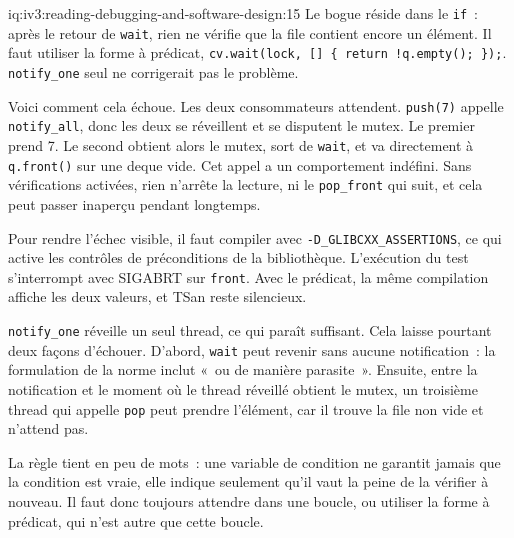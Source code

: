 \begin{solution}{iq:iv3:reading-debugging-and-software-design:15}
Le bogue réside dans le \texttt{if}~: après le retour de \texttt{wait}, rien ne vérifie que la file contient encore un élément. Il faut utiliser la forme à prédicat, \texttt{cv.wait(lock, [] \{ return !q.empty(); \});}. \texttt{notify\_one} seul ne corrigerait pas le problème.

Voici comment cela échoue. Les deux consommateurs attendent. \texttt{push(7)} appelle \texttt{notify\_all}, donc les deux se réveillent et se disputent le mutex. Le premier prend 7. Le second obtient alors le mutex, sort de \texttt{wait}, et va directement à \texttt{q.front()} sur une deque vide. Cet appel a un comportement indéfini. Sans vérifications activées, rien n'arrête la lecture, ni le \texttt{pop\_front} qui suit, et cela peut passer inaperçu pendant longtemps.

Pour rendre l'échec visible, il faut compiler avec \texttt{-D\_GLIBCXX\_ASSERTIONS}, ce qui active les contrôles de préconditions de la bibliothèque. L'exécution du test s'interrompt avec SIGABRT sur \texttt{front}. Avec le prédicat, la même compilation affiche les deux valeurs, et TSan reste silencieux.

\texttt{notify\_one} réveille un seul thread, ce qui paraît suffisant. Cela laisse pourtant deux façons d'échouer. D'abord, \texttt{wait} peut revenir sans aucune notification~: la formulation de la norme inclut «~ou de manière parasite~». Ensuite, entre la notification et le moment où le thread réveillé obtient le mutex, un troisième thread qui appelle \texttt{pop} peut prendre l'élément, car il trouve la file non vide et n'attend pas.

La règle tient en peu de mots~: une variable de condition ne garantit jamais que la condition est vraie, elle indique seulement qu'il vaut la peine de la vérifier à nouveau. Il faut donc toujours attendre dans une boucle, ou utiliser la forme à prédicat, qui n'est autre que cette boucle.


\end{solution}

